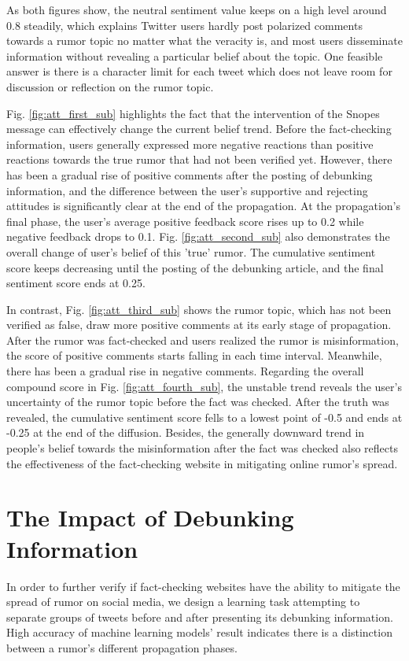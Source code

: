 \documentclass[conference]{IEEEtran}
\begin{document}
	As both figures show, the neutral sentiment value keeps on a high level around 0.8 steadily, which explains Twitter users hardly post polarized comments towards a rumor topic no matter what the veracity is, and most users disseminate information without revealing a particular belief about the topic. One feasible answer \cite{li2016user} is there is a character limit for each tweet which does not leave room for discussion or reflection on the rumor topic. 
	
	Fig. \ref{fig:att_first_sub} highlights the fact that the intervention of the Snopes message can effectively change the current belief trend. Before the fact-checking information, users generally expressed more negative reactions than positive reactions towards the true rumor that had not been verified yet. However, there has been a gradual rise of positive comments after the posting of debunking information, and the difference between the user's supportive and rejecting attitudes is significantly clear at the end of the propagation. At the propagation's final phase, the user's average positive feedback score rises up to 0.2 while negative feedback drops to 0.1. Fig. \ref{fig:att_second_sub} also demonstrates the overall change of user's belief of this 'true' rumor. The cumulative sentiment score keeps decreasing until the posting of the debunking article, and the final sentiment score ends at 0.25. 
	
	In contrast, Fig. \ref{fig:att_third_sub} shows the rumor topic, which has not been verified as false, draw more positive comments at its early stage of propagation. After the rumor was fact-checked and users realized the rumor is misinformation, the score of positive comments starts falling in each time interval. Meanwhile, there has been a gradual rise in negative comments. Regarding the overall compound score in Fig. \ref{fig:att_fourth_sub}, the unstable trend reveals the user's uncertainty of the rumor topic before the fact was checked. After the truth was revealed, the cumulative sentiment score fells to a lowest point of -0.5 and ends at -0.25 at the end of the diffusion. Besides, the generally downward trend in people's belief towards the misinformation after the fact was checked also reflects the effectiveness of the fact-checking website in mitigating online rumor's spread.
	
	\section{The Impact of Debunking Information}
	In order to further verify if fact-checking websites have the ability to mitigate the spread of rumor on social media, we design a learning task attempting to separate groups of tweets before and after presenting its debunking information. High accuracy of machine learning models' result indicates there is a distinction between a rumor's different propagation phases.
	
\end{document}
